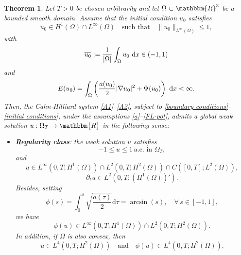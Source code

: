 \documentclass[11pt,  reqno]{amsart}%
\theoremstyle{plain}
\newtheorem{theorem}{Theorem}[section]
\theoremstyle{definition}
\theoremstyle{remark}
\numberwithin{equation}{section}
\newcommand{\dx}{\textup{d}x}
\newcommand{\ds}{\textup{d}s}
\begin{document}
	\begin{theorem} 
    \label{Main Result}
		Let $T>0$ be chosen arbitrarily and let $\Omega \subset \mathbbm{R}^3$ be a bounded smooth domain. 
		Assume that the initial condition $u_0$ satisfies
        \begin{equation}
            \label{I1}
            u_0 \in H^1(\Omega) \cap L^\infty(\Omega) \quad \text{such that}\quad \|u_0\|_{L^\infty(\Omega)}\le 1,
        \end{equation}
		with 
		\begin{equation}
        \label{mass}
			\overline{u_0}:= \dfrac{1}{|\Omega|}\int_{\Omega} u_0\ \dx \in (-1,1)
		\end{equation}
		 and
		\begin{equation}
		\label{E-0}
 		 E(u_0)=\int_{\Omega} \left( \frac{a(u_0)}{2} |\nabla u_0|^2 +   \Psi(u_0) \right) \ \dx<\infty.
 \end{equation}
		Then, the Cahn-Hilliard system \eqref{A1}--\eqref{A2}, subject to \eqref{boundary conditions}--\eqref{initial conditions}, under the assumptions \eqref{a}--\eqref{FL-pot}, admits a global weak solution $u: \Omega_T  \to \mathbbm{R}$ in the following sense:
		\begin{itemize}
			\item[(i)]  \textbf{Regularity class}: the weak solution $u$ satisfies
            $$-1\le u \le 1 \ \mbox{a.e. in } \Omega_T,$$
            and
            $$u \in L^\infty(0,T;H^1(\Omega))\cap 
             L^2(0,T;H^2(\Omega)) \cap C([0,T]; L^2(\Omega)),$$
            $$\partial_t u  \in L^2(0,T; (H^{1}(\Omega))').$$
			Besides, setting
            $$\phi(s) = \int_0^s \sqrt{\dfrac{a(\tau)}{2}} \mathrm{d}\tau =
            \arcsin (s), \quad \forall \, s \in [-1,1],
            $$
            we have 
            $$ \phi(u) \in L^\infty(0,T;H^1(\Omega))\cap 
            L^2(0,T;H^2(\Omega)).
            $$
            In addition, if $\Omega$ is also convex, then
            $$          
              u\in L^4(0,T;H^2(\Omega))\quad \text{and} \quad \phi(u) \in L^4(0,T;H^2(\Omega)).
            $$
			

\end{itemize}
\end{theorem}
\end{document}
